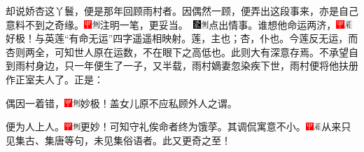 却说娇杏这丫鬟，便是那年回顾雨村者。因偶然一顾，便弄出这段事来，亦是自己意料不到之奇缘。{{\includegraphics[width=3mm]{../Images/00002}\includegraphics[width=3mm]{../Images/00011}\footnotesize \kaishu 注明一笔，更妥当。　}\includegraphics[width=3mm]{../Images/00006}\includegraphics[width=3mm]{../Images/00011}\footnotesize \kaishu 点出情事。}谁想他命运两济，{\includegraphics[width=3mm]{../Images/00002}\includegraphics[width=3mm]{../Images/00010}\footnotesize \kaishu 好极！与英莲``有命无运''四字遥遥相映射。莲，主也；杏，仆也。今莲反无运，而杏则两全，可知世人原在运数，不在眼下之高低也。此则大有深意存焉。}不承望自到雨村身边，只一年便生了一子，又半载，雨村嫡妻忽染疾下世，雨村便将他扶册作正室夫人了。正是：

偶因一着错，{\includegraphics[width=3mm]{../Images/00002}\includegraphics[width=3mm]{../Images/00011}\footnotesize \kaishu 妙极！盖女儿原不应私顾外人之谓。}

便为人上人。{\includegraphics[width=3mm]{../Images/00002}\includegraphics[width=3mm]{../Images/00011}\footnotesize \kaishu 更妙！可知守礼俟命者终为饿莩。其调侃寓意不小。\includegraphics[width=3mm]{../Images/00002}\includegraphics[width=3mm]{../Images/00010}\footnotesize \kaishu 从来只见集古、集唐等句，未见集俗语者。此又更奇之至！}

